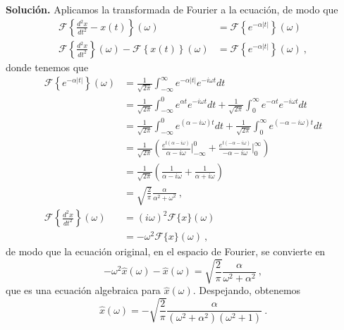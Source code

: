 \begin{ejemplo}
    \textbf{Solución.} Aplicamos la transformada de Fourier a la ecuación, de modo que
    \begin{align}
        \mathcal{F}\left\{ \frac{d^2 x}{dt^2} - x(t) \right\}(\omega) & =  \mathcal{F} \left\{ e^{-\alpha |t|} \right\}(\omega) \\
        \mathcal{F} \left\{ \frac{d^2x}{dt^2} \right\}(\omega) - \mathcal{F} \left\{ x(t) \right\}(\omega)  & = \mathcal{F} \left\{ e^{-\alpha |t|} \right\}(\omega) \ ,
    \end{align}
    donde tenemos que
    \begin{align}
        \mathcal{F} \left\{ e^{-\alpha |t|} \right\}(\omega) & = \frac{1}{\sqrt{2\pi}} \int_{-\infty}^\infty e^{-\alpha |t|} e^{-i\omega t} dt \nonumber \\
        & = \frac{1}{\sqrt{2\pi}} \int_{-\infty}^0 e^{\alpha t} e^{-i\omega t} dt + \frac{1}{\sqrt{2\pi}} \int_0^\infty e^{-\alpha t} e^{-i\omega t} dt \nonumber \\
        & = \frac{1}{\sqrt{2\pi}} \int_{-\infty}^0 e^{(\alpha -i\omega) t} dt + \frac{1}{\sqrt{2\pi}} \int_0^\infty e^{(-\alpha -i\omega) t} dt \nonumber \\
        & = \frac{1}{\sqrt{2\pi}} \left( \frac{e^{t(\alpha - i \omega)}}{\alpha - i\omega} \left.\right|_{-\infty}^0 + \frac{e^{t(-\alpha - i \omega)}}{-\alpha - i\omega} \left.\right|_0^{\infty}\right) \nonumber \\
        & = \frac{1}{\sqrt{2\pi}} \left( \frac{1}{\alpha - i\omega} + \frac{1}{\alpha + i\omega} \right) \nonumber \\
        & = \sqrt{\frac{2}{\pi}} \frac{\alpha}{\alpha^2 + \omega^2} \ , \\
        \mathcal{F} \left\{ \frac{d^2x}{dt^2} \right\}(\omega) & = (i\omega)^2 \mathcal{F}\{ x \}(\omega) \nonumber \\
        & = -\omega^2 \mathcal{F}\{ x \}(\omega) \ ,
    \end{align}
    de modo que la ecuación original, en el espacio de Fourier, se convierte en
    \begin{equation}
        -\omega^2 \hat{x}(\omega) - \hat{x}(\omega) = \sqrt{\frac{2}{\pi}} \frac{\alpha}{\omega^2 + \alpha^2} \ ,
    \end{equation}
    que es una ecuación algebraica para $\hat{x}(\omega)$. Despejando, obtenemos
    \begin{equation} \label{eq:solucion_edo_fourier}
        \hat{x}(\omega) = - \sqrt{\frac{2}{\pi}} \frac{\alpha}{(\omega^2 + \alpha^2) (\omega^2 + 1)} \ .

\end{equation}
\end{ejemplo}
